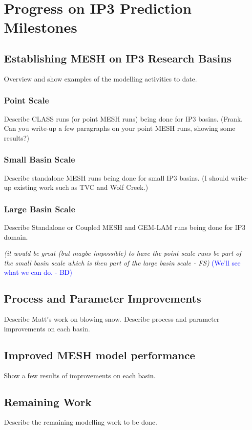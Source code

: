 \documentclass[hess]{copernicus}
\begin{document}
\section{Progress on IP3 Prediction Milestones}

\subsection{Establishing MESH on IP3 Research Basins}
Overview and show examples of the modelling activities to date.

\subsubsection{Point Scale}
Describe CLASS runs (or point MESH runs) being done for IP3 basins. (Frank. Can you write-up a few paragraphs on your point MESH runs, showing some results?)

\subsubsection{Small Basin Scale}
Describe standalone MESH runs being done for small IP3 basins. (I should write-up existing work such as TVC and Wolf Creek.)

\subsubsection{Large Basin Scale}
Describe Standalone or Coupled MESH and GEM-LAM runs being done for IP3 domain.

{\em (it would be great (but maybe impossible) to have the point scale runs be part of the small basin scale which is then part of the large basin scale - FS)}\textcolor{blue}{ (We'll see what we can do. - BD) }

\subsection{Process and Parameter Improvements}
Describe Matt's work on blowing snow. Describe process and parameter improvements on each basin.

\subsection{Improved MESH model performance}
Show a few results of improvements on each basin.

\subsection{Remaining Work}
Describe the remaining modelling work to be done.
\end{document}
